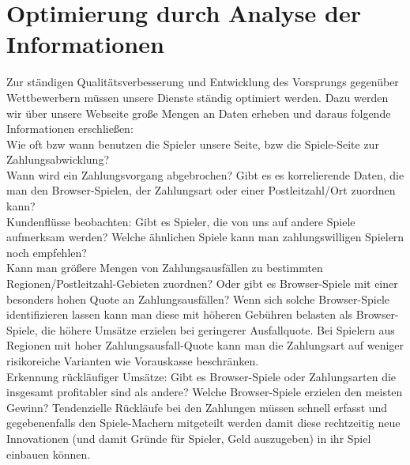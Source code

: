 \documentclass[a4paper,10pt]{article}
\begin{document}
\section{Optimierung durch Analyse der Informationen}\label{labelRelDaten}
Zur ständigen Qualitätsverbesserung und Entwicklung des Vorsprungs gegenüber Wettbewerbern müssen unsere Dienste ständig optimiert werden.
Dazu werden wir über unsere Webseite große Mengen an Daten erheben und daraus folgende Informationen erschließen:\\
Wie oft bzw wann benutzen die Spieler unsere Seite, bzw die Spiele-Seite zur Zahlungsabwicklung?\\
Wann wird ein Zahlungsvorgang abgebrochen? Gibt es es korrelierende Daten, die man den Browser-Spielen, der Zahlungsart oder einer Postleitzahl/Ort zuordnen kann?\\
Kundenflüsse beobachten: Gibt es Spieler, die von uns auf andere Spiele aufmerksam werden? Welche ähnlichen Spiele kann man zahlungswilligen Spielern noch empfehlen?\\
Kann man größere Mengen von Zahlungsausfällen zu bestimmten Regionen/Postleitzahl-Gebieten zuordnen? Oder gibt es Browser-Spiele mit einer besonders hohen Quote an Zahlungsausfällen?
Wenn sich solche Browser-Spiele identifizieren lassen kann man diese mit höheren Gebühren belasten als Browser-Spiele, die höhere Umsätze erzielen bei geringerer Ausfallquote.
Bei Spielern aus Regionen mit hoher Zahlungsausfall-Quote kann man die Zahlungsart auf weniger risikoreiche Varianten wie Vorauskasse beschränken.\\
Erkennung rückläufiger Umsätze: Gibt es Browser-Spiele oder Zahlungsarten die insgesamt profitabler sind als andere? Welche Browser-Spiele erzielen den meisten Gewinn?
Tendenzielle Rückläufe bei den Zahlungen müssen schnell erfasst und gegebenenfalls den Spiele-Machern mitgeteilt werden damit diese rechtzeitig neue Innovationen (und damit Gründe für Spieler,
Geld auszugeben) in ihr Spiel einbauen können.
\end{document}
